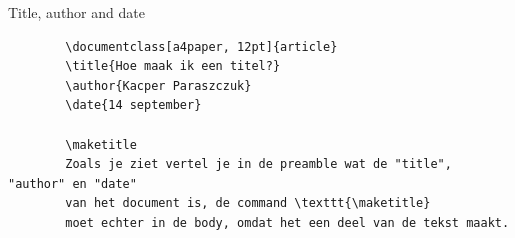 \copyrightTim

\begin{frame}[fragile]{Title, author and date}
    \begin{verbatim}
        \documentclass[a4paper, 12pt]{article}
        \title{Hoe maak ik een titel?}
        \author{Kacper Paraszczuk}
        \date{14 september}
        
        \maketitle
        Zoals je ziet vertel je in de preamble wat de "title", "author" en "date" 
        van het document is, de command \texttt{\maketitle} 
        moet echter in de body, omdat het een deel van de tekst maakt.
        
    \end{verbatim}
\end{frame}


